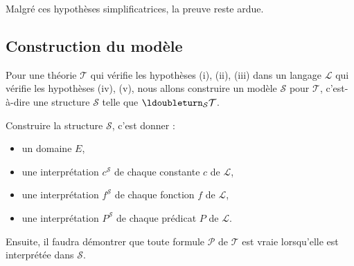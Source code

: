 \documentclass[11pt,class=report,crop=false]{standalone}
\begin{document}
Malgré ces hypothèses simplificatrices, la preuve reste ardue.

\subsection{Construction du modèle}
\label{ssec:modele}

Pour une théorie $\mathcal{T}$ qui vérifie les hypothèses (i), (ii), (iii)
dans un langage $\mathcal{L}$ qui vérifie les hypothèses (iv), (v), nous allons construire un modèle $\mathcal{S}$ pour $\mathcal{T}$, c'est-à-dire une structure $\mathcal{S}$ telle que $\ldoubleturn_{\mathcal{S}} \mathcal{T}$.

Construire la structure $\mathcal{S}$, c'est donner :
\begin{itemize}
	\item un domaine $E$,
	\item une interprétation $c^{\mathcal{S}}$ de chaque constante $c$ de $\mathcal{L}$,
	\item une interprétation $f^{\mathcal{S}}$ de chaque fonction $f$ de $\mathcal{L}$,
	\item une interprétation $P^{\mathcal{S}}$ de chaque prédicat $P$ de $\mathcal{L}$.
\end{itemize}

Ensuite, il faudra démontrer que toute formule $\mathcal{P}$ de $\mathcal{T}$ est vraie lorsqu'elle est interprétée dans $\mathcal{S}$.

\bigskip
\end{document}

